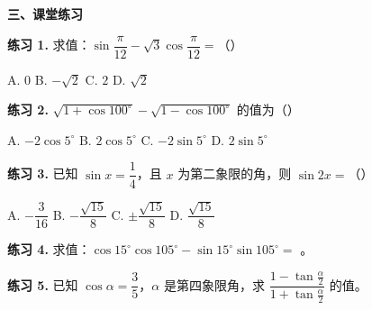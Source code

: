 \documentclass[UTF8,10pt,aspectratio=169]{ctexbeamer}
\begin{document}
	\begin{frame}
		\begin{center}
			{\Large \textbf{三、课堂练习}}
		\end{center}
		\vspace{0.3cm}
		
		\textbf{练习 1.} 求值：$\sin\dfrac{\pi}{12} - \sqrt{3}\cos\dfrac{\pi}{12} = $（\quad）
		
		A. $0$ \qquad B. $-\sqrt{2}$ \qquad C. $2$ \qquad D. $\sqrt{2}$
		
		\vspace{0.3cm}
		\textbf{练习 2.} $\sqrt{1+\cos 100^\circ} - \sqrt{1-\cos 100^\circ}$ 的值为（\quad）
		
		A. $-2\cos 5^\circ$ \qquad B. $2\cos 5^\circ$ \qquad C. $-2\sin 5^\circ$ \qquad D. $2\sin 5^\circ$
		
		\vspace{0.3cm}
		\textbf{练习 3.} 已知 $\sin x = \dfrac{1}{4}$，且 $x$ 为第二象限的角，则 $\sin 2x = $（\quad）
		
		A. $-\dfrac{3}{16}$ \qquad B. $-\dfrac{\sqrt{15}}{8}$ \qquad C. $\pm\dfrac{\sqrt{15}}{8}$ \qquad D. $\dfrac{\sqrt{15}}{8}$
		
		\vspace{0.3cm}
		\textbf{练习 4.} 求值：$\cos 15^\circ\cos 105^\circ - \sin 15^\circ\sin 105^\circ = $ \underline{\hspace{2.5cm}}。
		
		\vspace{0.3cm}
		\textbf{练习 5.} 已知 $\cos\alpha = \dfrac{3}{5}$，$\alpha$ 是第四象限角，求 $\dfrac{1-\tan\frac{\alpha}{2}}{1+\tan\frac{\alpha}{2}}$ 的值。
	\end{frame}
	
\end{document}

